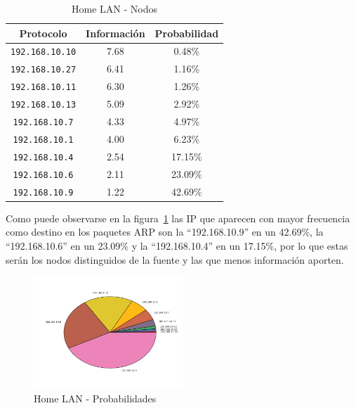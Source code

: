\documentclass[final,inline,narroweqnarray,a4paper]{ieee}
\begin{document}
\begin{table}[H]
    \begin{center}
        \begin{tabular}{|c|c|c|}
            \hline
            \textbf{Protocolo} & \textbf{Información} & \textbf{Probabilidad} \\ \hline
            \texttt{192.168.10.10}&7.68        & 0.48\%     \\ \hline
            \texttt{192.168.10.27}&6.41        & 1.16\%     \\ \hline
            \texttt{192.168.10.11}&6.30        & 1.26\%     \\ \hline
            \texttt{192.168.10.13}&5.09        & 2.92\%     \\ \hline
            \texttt{192.168.10.7}&4.33         & 4.97\%     \\ \hline
            \texttt{192.168.10.1}&4.00         & 6.23\%     \\ \hline
            \texttt{192.168.10.4}&2.54         & 17.15\%    \\ \hline
            \texttt{192.168.10.6}&2.11         & 23.09\%    \\ \hline
            \texttt{192.168.10.9}&1.22         & 42.69\%    \\ \hline
        \end{tabular}
        \caption{Home LAN - Nodos}
        \label{table:homelanS1}
    \end{center}
\end{table}

Como puede observarse en la figura~\ref{torta:homelanS1} las IP que aparecen con mayor frecuencia como destino en los paquetes ARP son la ``192.168.10.9'' en un 42.69\%, la ``192.168.10.6'' en un 23.09\% y la ``192.168.10.4'' en un 17.15\%, por lo que estas serán los nodos distinguidos de la fuente y las que menos información aporten.

\begin{figure}[H]
    \begin{center}
        \includegraphics[width=0.5\textwidth]{plot/homelanS1-pie.png}
        \caption{Home LAN - Probabilidades}
        \label{torta:homelanS1}
    \end{center}
\end{figure} 
\end{document}
